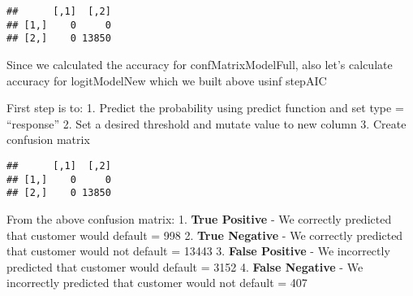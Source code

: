 \documentclass[
]{article}
\newenvironment{Shaded}{\begin{snugshade}}{\end{snugshade}}
\newcommand{\CommentTok}[1]{\textcolor[rgb]{0.56,0.35,0.01}{\textit{#1}}}
\newcommand{\DataTypeTok}[1]{\textcolor[rgb]{0.13,0.29,0.53}{#1}}
\newcommand{\DecValTok}[1]{\textcolor[rgb]{0.00,0.00,0.81}{#1}}
\newcommand{\FloatTok}[1]{\textcolor[rgb]{0.00,0.00,0.81}{#1}}
\newcommand{\KeywordTok}[1]{\textcolor[rgb]{0.13,0.29,0.53}{\textbf{#1}}}
\newcommand{\NormalTok}[1]{#1}
\newcommand{\OperatorTok}[1]{\textcolor[rgb]{0.81,0.36,0.00}{\textbf{#1}}}
\newcommand{\StringTok}[1]{\textcolor[rgb]{0.31,0.60,0.02}{#1}}
\begin{document}
\begin{verbatim}
##      [,1]  [,2]
## [1,]    0     0
## [2,]    0 13850
\end{verbatim}

Since we calculated the accuracy for confMatrixModelFull, also let's
calculate accuracy for logitModelNew which we built above usinf stepAIC

First step is to: 1. Predict the probability using predict function and
set type = ``response'' 2. Set a desired threshold and mutate value to
new column 3. Create confusion matrix

\begin{Shaded}
\end{Shaded}

\begin{verbatim}
##      [,1]  [,2]
## [1,]    0     0
## [2,]    0 13850
\end{verbatim}

From the above confusion matrix: 1. \textbf{True Positive} - We
correctly predicted that customer would default = 998 2. \textbf{True
Negative} - We correctly predicted that customer would not default =
13443 3. \textbf{False Positive} - We incorrectly predicted that
customer would default = 3152 4. \textbf{False Negative} - We
incorrectly predicted that customer would not default = 407
\end{document}
